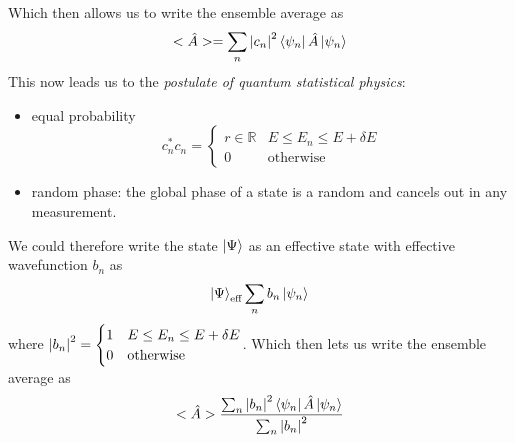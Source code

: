 \documentclass{report}
\begin{document}
Which then allows us to write the ensemble average as
\[
  <\hat{A}> = \sum_{n} \abs{c_n}^2 \bra{\psi_n} \hat{A} \ket{\psi_n}  
\] 
This now leads us to the \emph{postulate of quantum statistical physics}: 
\begin{itemize}
  \item equal probability \[
  c_n^* c_n = \begin{cases}
    r \in \mathbb{R} & E \le E_n \le E + \delta E \\
    0 & \text{otherwise}
  \end{cases}
  \] 
\item random phase: the global phase of a state is a random and cancels out in any measurement.
\end{itemize}
We could therefore write the state $\ket{\Psi}$ as an effective state with effective wavefunction $b_n$ as \[
\ket{\Psi}_{\text{eff}} \sum_{n} b_n \ket{\psi_n} 
\] where $\abs{b_n}^2 = \begin{cases}
1 & E \le  E_n \le E + \delta E \\
0 & \text{otherwise}
\end{cases}$. Which then lets us write the ensemble average as \[
<\hat{A}> \frac{ \sum_{n} \abs{b_n}^2 \bra{\psi_n} \hat{A} \ket{\psi_n}  }{ \sum_{n} \abs{b_n}^2 }
\] 
\end{document}

